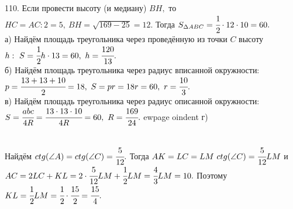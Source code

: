 110. Если провести высоту (и медиану) $BH,$ то $HC=AC:2=5,\ BH=\sqrt{169-25}=12.$ Тогда $S_{\Delta ABC}=\cfrac{1}{2}\cdot12\cdot10=60.$\\
а) Найдём площадь треугольника через проведённую из точки $C$ высоту $h:\ S=\cfrac{1}{2}h\cdot13=60,\ h=\cfrac{120}{13}.$\\
б) Найдём площадь треугольника через радиус вписанной окружности: $p=\cfrac{13+13+10}{2}=18,\ S=pr=18r=60,\ r=\cfrac{10}{3}.$\\
в) Найдём площадь треугольника через радиус описанной окружности: $S=\cfrac{abc}{4R}=\cfrac{13\cdot13\cdot10}{4R}=60,\ R=\cfrac{169}{24}.$
ewpage
oindent
г) \begin{figure}[ht!]
\end{figure}\\
Найдём $ctg(\angle A)=ctg(\angle C)=\cfrac{5}{12}.$ Тогда $AK=LC=LM\ ctg(\angle C)=\cfrac{5}{12}LM$ и $AC=2LC+KL=2\cdot\cfrac{5}{12}LM+\cfrac{1}{2}LM=\cfrac{4}{3}LM=10.$ Поэтому $KL=\cfrac{1}{2}LM=\cfrac{1}{2}\cdot\cfrac{15}{2}=\cfrac{15}{4}.$\\
